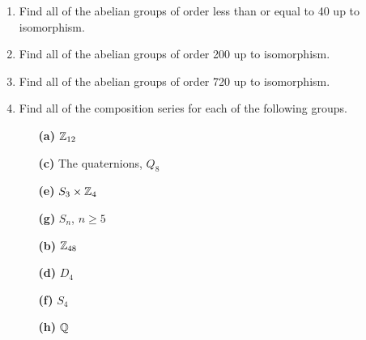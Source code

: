 {\small
\begin{enumerate}
 
\bf\item\rm
Find all of the abelian groups of order less than or equal to 40 up to
isomorphism.
 
\bf\item\rm
Find all of the abelian groups of order 200 up to isomorphism.
 
\bf\item\rm
Find all of the abelian groups of order 720 up to isomorphism.
 
\bf\item\rm
Find all of the composition series for each of the following groups.
 
 
\vspace{3pt}        %
 
\hspace{-7pt}
\begin{minipage}[t]{4.6in}
\noindent
\begin{minipage}[t]{2.25in}
\begin{itemize}
 
 \item[{\bf (a)}]
${\Bbb Z}_{12}$
 
 \item[{\bf (c)}]
The quaternions, $Q_8$
 
 \item[{\bf (e)}]
$S_3 \times {\Bbb Z}_4$
 
 \item[{\bf (g)}]
$S_n$, $n \geq 5$
 
\end{itemize}
\end{minipage} \hfill
\begin{minipage}[t]{2.25in}
\begin{itemize}
 
 \item[{\bf (b)}]
${\Bbb Z}_{48}$
 
 \item[{\bf (d)}]
$D_4$
 
 \item[{\bf (f)}]
$S_4$
 
 \item[{\bf (h)}]
${\Bbb Q}$
 
\end{itemize}
\end{minipage}
\end{minipage}
 
\vspace{2pt}        %
 

\end{enumerate}}
